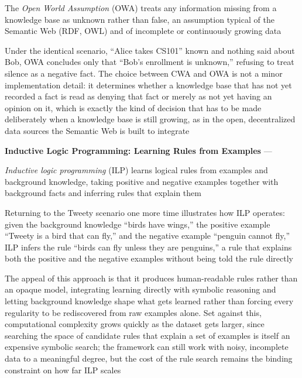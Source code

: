 \begin{definition}
  The \emph{Open World Assumption} (OWA) treats any information missing
  from a knowledge base as unknown rather than false, an assumption typical
  of the Semantic Web (RDF, OWL) and of incomplete or continuously growing
  data
\end{definition}
Under the identical scenario, ``Alice takes CS101'' known and nothing said
about Bob, OWA concludes only that ``Bob's enrollment is unknown,'' refusing
to treat silence as a negative fact. The choice between CWA and OWA is not
a minor implementation detail: it determines whether a knowledge base that
has not yet recorded a fact is read as denying that fact or merely as not
yet having an opinion on it, which is exactly the kind of decision that has
to be made deliberately when a knowledge base is still growing, as in the
open, decentralized data sources the Semantic Web is built to integrate

\textbf{Inductive Logic Programming: Learning Rules from Examples} ---
\begin{definition}
  \emph{Inductive logic programming} (ILP) learns logical rules from
  examples and background knowledge, taking positive and negative examples
  together with background facts and inferring rules that explain them
\end{definition}
Returning to the Tweety scenario one more time illustrates how ILP
operates: given the background knowledge ``birds have wings,'' the positive
example ``Tweety is a bird that can fly,'' and the negative example
``penguin cannot fly,'' ILP infers the rule ``birds can fly unless they are
penguins,'' a rule that explains both the positive and the negative
examples without being told the rule directly

The appeal of this approach is that it produces human-readable rules
rather than an opaque model, integrating learning directly with symbolic
reasoning and letting background knowledge shape what gets learned rather
than forcing every regularity to be rediscovered from raw examples alone.
Set against this, computational complexity grows quickly as the dataset
gets larger, since searching the space of candidate rules that explain a
set of examples is itself an expensive symbolic search; the framework can
still work with noisy, incomplete data to a meaningful degree, but the cost
of the rule search remains the binding constraint on how far ILP scales

